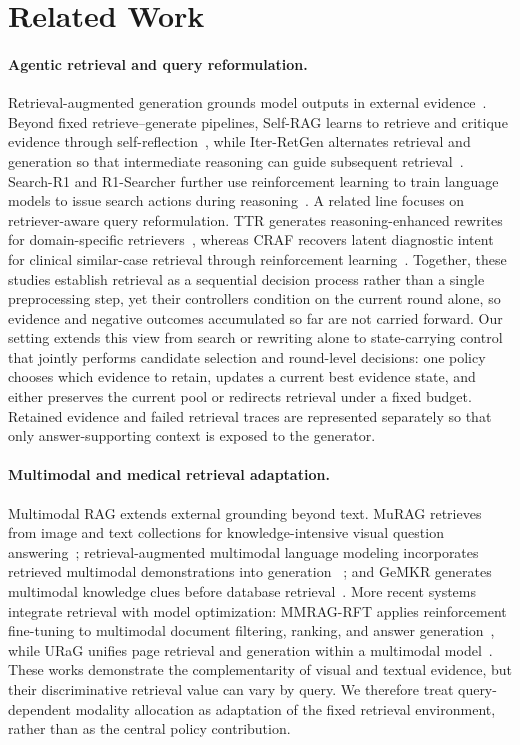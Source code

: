 \section{Related Work}
\label{sec:related_work}

\paragraph{Agentic retrieval and query reformulation.}
Retrieval-augmented generation grounds model outputs in external
evidence~\cite{lewis2020retrieval}. Beyond fixed retrieve--generate pipelines,
Self-RAG learns to retrieve and critique evidence through
self-reflection~\cite{asai2024selfrag}, while Iter-RetGen alternates retrieval
and generation so that intermediate reasoning can guide subsequent
retrieval~\cite{shao2023iterretgen}. Search-R1 and R1-Searcher further use
reinforcement learning to train language models to issue search actions during
reasoning~\cite{jin2025searchr1,song2025r1searcher}. A related line focuses on
retriever-aware query reformulation. TTR generates reasoning-enhanced rewrites
for domain-specific retrievers~\cite{li2026ttr}, whereas CRAF recovers latent
diagnostic intent for clinical similar-case retrieval through reinforcement
learning~\cite{lin2026craf}. Together, these studies establish retrieval as a
sequential decision process rather than a single preprocessing step, yet their
controllers condition on the current round alone, so evidence and negative
outcomes accumulated so far are not carried forward. Our setting extends this
view from search or rewriting alone to state-carrying control that jointly
performs candidate selection and round-level decisions: one policy chooses which
evidence to retain, updates a current best evidence state, and either preserves
the current pool or redirects retrieval under a fixed budget. Retained evidence
and failed retrieval traces are represented separately so that only
answer-supporting context is exposed to the generator.

\paragraph{Multimodal and medical retrieval adaptation.}
Multimodal RAG extends external grounding beyond text. MuRAG retrieves from
image and text collections for knowledge-intensive visual question
answering~\cite{chen2022murag}; retrieval-augmented multimodal language modeling
incorporates retrieved multimodal demonstrations into generation
~\cite{yasunaga2023retrieval}; and GeMKR generates multimodal knowledge clues
before database retrieval~\cite{long2024gemkr}. More recent systems integrate
retrieval with model optimization: MMRAG-RFT applies reinforcement fine-tuning
to multimodal document filtering, ranking, and answer
generation~\cite{zhao2026mmragrft}, while URaG unifies page retrieval and
generation within a multimodal model~\cite{shi2026urag}. These works demonstrate
the complementarity of visual and textual evidence, but their discriminative
retrieval value can vary by query. We therefore treat query-dependent modality
allocation as adaptation of the fixed retrieval environment, rather than as
the central policy contribution.

